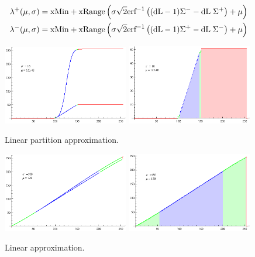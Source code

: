 \begin{equation}\label{eq:LowHighGen}
\begin{aligned}
\lambda^+(\mu,\sigma)  &=  \text{xMin} + \text{xRange} \left( \sigma \sqrt{2}  \text{erf}^{-1}\left((\text{dL}-1) \Sigma^- -\text{dL} \; \Sigma^+ \right)+\mu \right) \\
\lambda^-(\mu,\sigma)  &=  \text{xMin} + \text{xRange} \left( \sigma \sqrt{2} \text{erf}^{-1}\left((\text{dL}-1) \Sigma^+-\text{dL} \; \Sigma^-\right)+\mu \right)
\end{aligned}
\end{equation}



\begin{figure}[h!]
  \centering
    \includegraphics[width=0.49\textwidth]{Chapter2/Figs/partitionSmooth2.eps}
    \includegraphics[width=0.49\textwidth]{Chapter2/Figs/partitionColor2.eps}
    \caption{Linear partition approximation.}  \label{fig:Partition}
\end{figure}

\begin{figure}[h!]
  \centering
    \includegraphics[width=0.49\textwidth]{Chapter2/Figs/linearSmooth2.eps}
    \includegraphics[width=0.49\textwidth]{Chapter2/Figs/linearColor2.eps}
    \caption{Linear approximation.}  \label{fig:Linear}
\end{figure}

